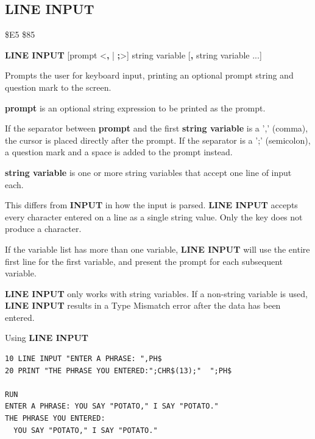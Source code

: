 \subsection{LINE INPUT}
\begin{description}[leftmargin=2cm,style=nextline]
\item [Token:]    \$E5 \$85
\item [Format:]   {\bf LINE INPUT} [prompt <{\bf,} | {\bf;}>] string variable [{\bf,} string variable ...]
\item [Usage:]    Prompts the user for keyboard input, printing an optional prompt string and question mark to the screen.

                  {\bf prompt} is an optional string expression to be printed as the prompt.

                  If the separator between {\bf prompt} and the first {\bf string variable} is a ',' (comma), the cursor is placed directly after the prompt. If the separator is a ';' (semicolon), a question mark and a space is added to the prompt instead.

                  {\bf string variable} is one or more string variables that accept one line of input each.

\item [Remarks:]  This differs from {\bf INPUT} in how the input is parsed. {\bf LINE INPUT} accepts every character entered on a line as a single string value. Only the  key does not produce a character.

                  If the variable list has more than one variable, {\bf LINE INPUT} will use the entire first line for the first variable, and present the  prompt for each subsequent variable.

                  {\bf LINE INPUT} only works with string variables. If a non-string variable is used, {\bf LINE INPUT} results in a Type Mismatch error after the data has been entered.

\item [Example:]  Using {\bf LINE INPUT}

\begin{tcolorbox}[colback=black,coltext=white]
\verbatimfont{\codefont}
\begin{verbatim}
10 LINE INPUT "ENTER A PHRASE: ",PH$
20 PRINT "THE PHRASE YOU ENTERED:";CHR$(13);"  ";PH$

RUN
ENTER A PHRASE: YOU SAY "POTATO," I SAY "POTATO."
THE PHRASE YOU ENTERED:
  YOU SAY "POTATO," I SAY "POTATO."
\end{verbatim}
\end{tcolorbox}
\end{description}

